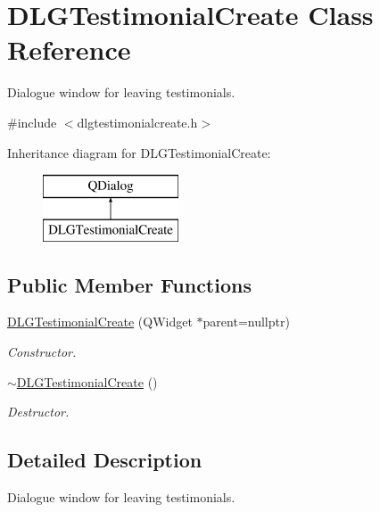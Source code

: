 \hypertarget{class_d_l_g_testimonial_create}{}\section{D\+L\+G\+Testimonial\+Create Class Reference}
\label{class_d_l_g_testimonial_create}


Dialogue window for leaving testimonials.  




{\ttfamily \#include $<$dlgtestimonialcreate.\+h$>$}

Inheritance diagram for D\+L\+G\+Testimonial\+Create\+:\begin{figure}[H]
\begin{center}
\leavevmode
\includegraphics[height=2.000000cm]{class_d_l_g_testimonial_create}
\end{center}
\end{figure}
\subsection*{Public Member Functions}
\begin{DoxyCompactItemize}
\item 
\mbox{\hyperlink{class_d_l_g_testimonial_create_a3bc6103ea5c15abd790e65fb2840205c}{D\+L\+G\+Testimonial\+Create}} (Q\+Widget $\ast$parent=nullptr)
\begin{DoxyCompactList}\small\item\em Constructor. \end{DoxyCompactList}\item 
\mbox{\hyperlink{class_d_l_g_testimonial_create_a8dcbb8630fee3de61526f8986bb4d58e}{$\sim$\+D\+L\+G\+Testimonial\+Create}} ()
\begin{DoxyCompactList}\small\item\em Destructor. \end{DoxyCompactList}\end{DoxyCompactItemize}


\subsection{Detailed Description}
Dialogue window for leaving testimonials. 



